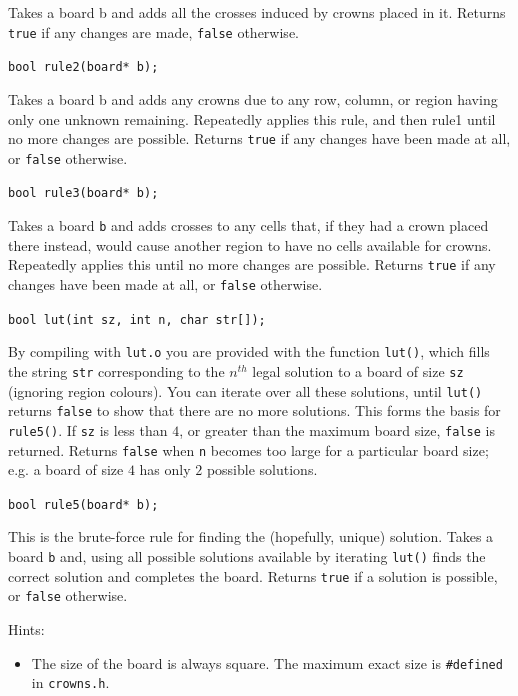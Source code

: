 \begin{exercise}
Takes a board b and adds all the crosses induced by
crowns placed in it. Returns \verb^true^ if any changes are
made, \verb^false^ otherwise.


\vspace{1em}
\verb^bool rule2(board* b);^

Takes a board b and adds any crowns due to any row, column, or
region having only one unknown remaining.  Repeatedly applies this rule,
and then rule1 until no more changes are possible. Returns \verb^true^ if
any changes have been made at all, or \verb^false^ otherwise.

\vspace{1em}
\verb^bool rule3(board* b);^

Takes a board \verb^b^ and adds crosses to any cells that, if they had a
crown placed there instead, would cause another region to have no cells
available for crowns. Repeatedly applies this until no more changes
are possible.  Returns \verb^true^ if any changes have been made at all,
or \verb^false^ otherwise.


\vspace{1em}
\verb^bool lut(int sz, int n, char str[]);^

By compiling with \verb^lut.o^ you are provided with the function
\verb^lut()^, which fills the string \verb^str^ corresponding to the
$n^{th}$ legal solution to a board of size \verb^sz^ (ignoring region
colours).  You can iterate over all these solutions, until \verb^lut()^
returns \verb^false^ to show that there are no more solutions. This
forms the basis for \verb^rule5()^.  If \verb^sz^ is less than $4$,
or greater than the maximum board size, \verb^false^ is returned.
Returns \verb^false^ when \verb^n^ becomes too large for a particular
board size; e.g. a board of size $4$ has only $2$ possible solutions.

\vspace{1em}
\verb^bool rule5(board* b);^

This is the brute-force rule for finding the (hopefully, unique) solution.
Takes a board \verb^b^ and, using all possible solutions available by
iterating \verb^lut()^ finds the correct solution and completes the board.
Returns \verb^true^ if a solution is possible, or \verb^false^ otherwise.

\noindent Hints:
\begin{itemize}

\item The size of the board is always square.
The maximum exact size is {\tt \#defined} in \verb^crowns.h^.


\end{itemize}
\end{exercise}
